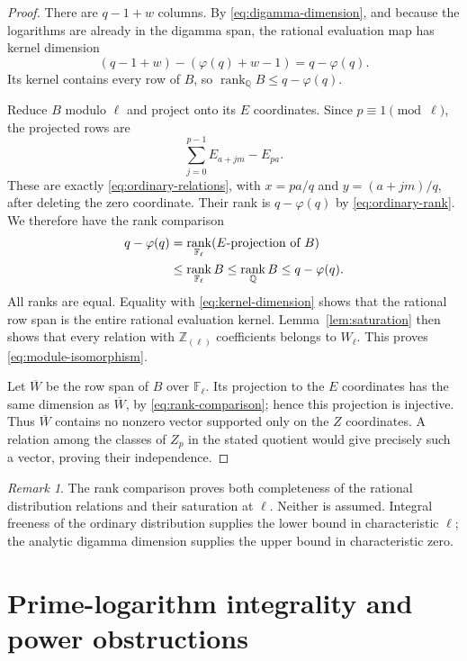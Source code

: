 \documentclass[11pt,a4paper]{article}
\theoremstyle{definition}
\theoremstyle{remark}
\newtheorem{remark}[theorem]{Remark}
\newcommand{\Q}{\mathbb Q}
\newcommand{\Z}{\mathbb Z}
\newcommand{\F}{\mathbb F}
\newcommand{\Zloc}{\Z_{(\ell)}}
\DeclareMathOperator{\rank}{rank}
\begin{document}
\begin{proof}
There are $q-1+w$ columns. By \eqref{eq:digamma-dimension}, and because
the logarithms are already in the digamma span, the rational evaluation
map has kernel dimension
\begin{equation}\label{eq:kernel-dimension}
 (q-1+w)-(\varphi(q)+w-1)=q-\varphi(q).
\end{equation}
Its kernel contains every row of $B$, so
$\rank_\Q B\le q-\varphi(q)$.

Reduce $B$ modulo $\ell$ and project onto its $E$ coordinates. Since
$p\equiv1\pmod\ell$, the projected rows are
\[
 \sum_{j=0}^{p-1}E_{a+jm}-E_{pa}.
\]
These are exactly \eqref{eq:ordinary-relations}, with
$x=pa/q$ and $y=(a+jm)/q$, after deleting the zero coordinate.
Their rank is $q-\varphi(q)$ by \eqref{eq:ordinary-rank}. We therefore
have the rank comparison
\begin{align}
 q-\varphi(q)
 &=\rank_{\F_\ell}(\text{$E$-projection of }B)\notag\\
 &\le\rank_{\F_\ell}B
 \le\rank_\Q B
 \le q-\varphi(q).\label{eq:rank-comparison}
\end{align}
All ranks are equal. Equality with \eqref{eq:kernel-dimension} shows
that the rational row span is the entire rational evaluation kernel.
Lemma~\ref{lem:saturation} then shows that every relation with
$\Zloc$ coefficients belongs to $W_\ell$. This proves
\eqref{eq:module-isomorphism}.

Let $\overline W$ be the row span of $B$ over $\F_\ell$. Its
projection to the $E$ coordinates has the same dimension as
$\overline W$, by \eqref{eq:rank-comparison}; hence this projection
is injective. Thus $\overline W$ contains no nonzero vector supported
only on the $Z$ coordinates. A relation among the classes of $Z_p$
in the stated quotient would give precisely such a vector, proving
their independence.
\end{proof}

\begin{remark}
The rank comparison proves both completeness of the rational
distribution relations and their saturation at $\ell$. Neither is
assumed. Integral freeness of the ordinary distribution supplies the
lower bound in characteristic $\ell$; the analytic digamma dimension
supplies the upper bound in characteristic zero.
\end{remark}

\section{Prime-logarithm integrality and power obstructions}
\end{document}
